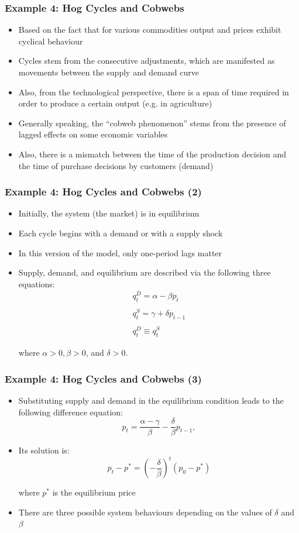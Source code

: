 \documentclass[10pt,usenames,dvipsnames]{beamer}
\theoremstyle{definition}
\begin{document}
\begin{frame}[fragile]
\frametitle{Example 4: Hog Cycles and Cobwebs}
\begin{itemize}
	\item Based on the fact that for various commodities output and prices exhibit cyclical behaviour  
	\item Cycles stem from the consecutive adjustments, which are manifested as movements between the supply and demand curve
	\item Also, from the technological perspective, there is a span of time required in order to produce a certain output (e.g. in agriculture)
	\item Generally speaking, the ``cobweb phenomenon'' stems from the presence of lagged effects on some economic variables
	\item Also, there is a mismatch between the time of the production decision and the time of purchase decisions by customers (demand)
\end{itemize}
\end{frame}

\begin{frame}[fragile]
\frametitle{Example 4: Hog Cycles and Cobwebs (2)}
\begin{itemize}
	\item Initially, the system (the market) is in equilibrium
	\item Each cycle begins with a demand or with a supply shock
	\item In this version of the model, only one-period lags matter
	\item Supply, demand, and equilibrium are described via the following three equations:
	\[
	\begin{array}{lcl}
		q_{t}^{D} = \alpha - \beta p_{t}\\
		\quad\\
		q_{t}^{S} = \gamma + \delta p_{t-1}\\
		\quad\\
		q_{t}^{D} \equiv q_{t}^{S}
	\end{array}
	\]
	
	where $\alpha > 0, \beta > 0$, and $\delta > 0$.
\end{itemize}
\end{frame}

\begin{frame}[fragile]
\frametitle{Example 4: Hog Cycles and Cobwebs (3)}
\begin{itemize}
	\item Substituting supply and demand in the equilibrium condition leads to the following difference equation:
	\[
		p_{t} = \frac{\alpha - \gamma}{\beta} - \frac{\delta}{\beta}p_{t-1},
	\]
	\item Its solution is:
	\[
		p_{t} - p^{*} = \left(-\frac{\delta}{\beta}\right)^{t}(p_{0} - p^{*})
	\]
	
	where $p^{*}$ is the equilibrium price
	\item There are three possible system behaviours depending on the values of $\delta$ and $\beta$
\end{itemize}
\end{frame}
\end{document}
